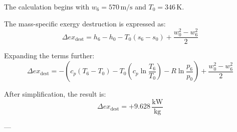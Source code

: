 The calculation begins with \( w_6 = 570 \, \text{m/s} \) and \( T_0 = 346 \, \text{K} \).  

The mass-specific exergy destruction is expressed as:  
\[
\Delta ex_{\text{dest}} = h_6 - h_0 - T_0 (s_6 - s_0) + \frac{w_0^2 - w_6^2}{2}
\]  

Expanding the terms further:  
\[
\Delta ex_{\text{dest}} = - (c_p (T_6 - T_0) - T_0 (c_p \ln \frac{T_6}{T_0}) - R \ln \frac{p_6}{p_0}) + \frac{w_0^2 - w_6^2}{2}
\]  

After simplification, the result is:  
\[
\Delta ex_{\text{dest}} = + 9.628 \, \frac{\text{kW}}{\text{kg}}
\]  

---